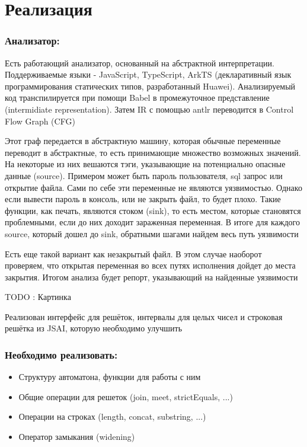 \section{Реализация}

\subsubsection*{Анализатор:}
Есть работающий анализатор, основанный на абстрактной интерпретации. Поддерживаемые языки - JavaScript, TypeScript, ArkTS (декларативный язык программирования статических типов, разработанный Huawei). Анализируемый код транспилируется при помощи Babel в промежуточное представление (intermidiate representation). Затем IR с помощью antlr переводится в Control Flow Graph (CFG)

Этот граф передается в абстрактную машину, которая обычные переменные переводит в абстрактные, то есть принимающие множество возможных значений. На некоторые из них вешаются тэги, указывающие на потенциально опасные данные (source). Примером может быть пароль пользователя, sql запрос или открытие файла. Сами по себе эти переменные не являются уязвимостью. Однако если вывести пароль в консоль, или не закрыть файл, то будет плохо. Такие функции, как печать, являются стоком (sink), то есть местом, которые становятся проблемными, если до них доходит зараженная переменная. В итоге для каждого source, который дошел до sink, обратными шагами найдем весь путь уязвимости

Есть еще такой вариант как незакрытый файл. В этом случае наоборот проверяем, что открытая переменная во всех путях исполнения дойдет до места закрытия. Итогом анализа будет репорт, указывающий на найденные уязвимости

TODO : Картинка

Реализован интерфейс для решёток, интервалы для целых чисел и строковая решётка из JSAI, которую необходимо улучшить



\newpage
\subsubsection*{Необходимо реализовать:}
\begin{itemize}
    \item Структуру автоматона, функции для работы с ним
    \item Общие операции для решеток (join, meet, strictEquals, ...)
    \item Операции на строках (length, concat, substring, ...)
    \item Оператор замыкания (widening)
\end{itemize}

